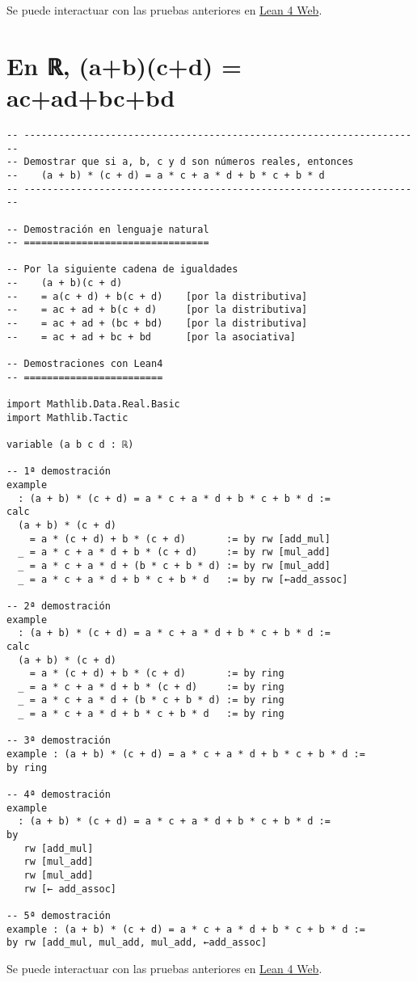 Se puede interactuar con las pruebas anteriores en \href{https://lean.math.hhu.de/\#url=https://raw.githubusercontent.com/jaalonso/Calculemus2/main/src/(a+b)(a+b)\_eq\_aa+2ab+bb.lean}{Lean 4 Web}.

\section{En ℝ, (a+b)(c+d) = ac+ad+bc+bd}
\label{sec:orge26f481}
\begin{verbatim}
-- ---------------------------------------------------------------------
-- Demostrar que si a, b, c y d son números reales, entonces
--    (a + b) * (c + d) = a * c + a * d + b * c + b * d
-- ---------------------------------------------------------------------

-- Demostración en lenguaje natural
-- ================================

-- Por la siguiente cadena de igualdades
--    (a + b)(c + d)
--    = a(c + d) + b(c + d)    [por la distributiva]
--    = ac + ad + b(c + d)     [por la distributiva]
--    = ac + ad + (bc + bd)    [por la distributiva]
--    = ac + ad + bc + bd      [por la asociativa]

-- Demostraciones con Lean4
-- ========================

import Mathlib.Data.Real.Basic
import Mathlib.Tactic

variable (a b c d : ℝ)

-- 1ª demostración
example
  : (a + b) * (c + d) = a * c + a * d + b * c + b * d :=
calc
  (a + b) * (c + d)
    = a * (c + d) + b * (c + d)       := by rw [add_mul]
  _ = a * c + a * d + b * (c + d)     := by rw [mul_add]
  _ = a * c + a * d + (b * c + b * d) := by rw [mul_add]
  _ = a * c + a * d + b * c + b * d   := by rw [←add_assoc]

-- 2ª demostración
example
  : (a + b) * (c + d) = a * c + a * d + b * c + b * d :=
calc
  (a + b) * (c + d)
    = a * (c + d) + b * (c + d)       := by ring
  _ = a * c + a * d + b * (c + d)     := by ring
  _ = a * c + a * d + (b * c + b * d) := by ring
  _ = a * c + a * d + b * c + b * d   := by ring

-- 3ª demostración
example : (a + b) * (c + d) = a * c + a * d + b * c + b * d :=
by ring

-- 4ª demostración
example
  : (a + b) * (c + d) = a * c + a * d + b * c + b * d :=
by
   rw [add_mul]
   rw [mul_add]
   rw [mul_add]
   rw [← add_assoc]

-- 5ª demostración
example : (a + b) * (c + d) = a * c + a * d + b * c + b * d :=
by rw [add_mul, mul_add, mul_add, ←add_assoc]
\end{verbatim}
Se puede interactuar con las pruebas anteriores en \href{https://lean.math.hhu.de/\#url=https://raw.githubusercontent.com/jaalonso/Calculemus2/main/src/(a+b)(c+d)\_eq\_ac+ad+bc+bd.lean}{Lean 4 Web}.

